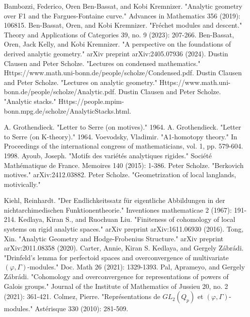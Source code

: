 \documentclass[12pt]{article}
\theoremstyle{definition}
\begin{document}
\newpage
\begin{thebibliography}{}

 Bambozzi, Federico, Oren Ben-Bassat, and Kobi Kremnizer. "Analytic geometry over F1 and the Fargues-Fontaine curve." Advances in Mathematics 356 (2019): 106815. 
 Ben-Bassat, Oren, and Kobi Kremnizer. "Fr\'echet modules and descent." Theory and Applications of Categories 39, no. 9 (2023): 207-266.
 Ben-Bassat, Oren, Jack Kelly, and Kobi Kremnizer. "A perspective on the foundations of derived analytic geometry." arXiv preprint arXiv:2405.07936 (2024).
 Dustin Clausen and Peter Scholze. "Lectures on condensed mathematics." Https://www.math.uni-bonn.de/people/scholze/Condensed.pdf. 
 Dustin Clausen and Peter Scholze. "Lectures on analytic geometry." Https://www.math.uni-bonn.de/people/scholze/Analytic.pdf.  
 Dustin Clausen and Peter Scholze. "Analytic stacks." Https://people.mpim-bonn.mpg.de/scholze/AnalyticStacks.html.  
 



 A. Grothendieck. "Letter to Serre (on motives)." 1964.
 A. Grothendieck. "Letter to Serre (on K-theory)." 1964.
 Voevodsky, Vladimir. "A1-homotopy theory." In Proceedings of the international congress of mathematicians, vol. 1, pp. 579-604. 1998. 
 Ayoub, Joseph. "Motifs des vari\'et\'es analytiques rigides." Soci\'et\'e Math\'ematique de France. Memoires 140 (2015): 1-386.
 Peter Scholze. "Berkovich motives." arXiv:2412.03882.
 Peter Scholze. "Geometrization of local langlands, motivically."


 Kiehl, Reinhardt. "Der Endlichkeitssatz f\"ur eigentliche Abbildungen in der nichtarchimedischen Funktionentheorie." Inventiones mathematicae 2 (1967): 191-214. 
 Kedlaya, Kiran S., and Ruochuan Liu. "Finiteness of cohomology of local systems on rigid analytic spaces." arXiv preprint arXiv:1611.06930 (2016).
 Tong, Xin. "Analytic Geometry and Hodge-Frobenius Structure." arXiv preprint arXiv:2011.08358 (2020).
 Carter, Annie, Kiran S. Kedlaya, and Gergely Z\'abr\'adi. "Drinfeld's lemma for perfectoid spaces and overconvergence of multivariate $(\varphi, \Gamma)$-modules." Doc. Math 26 (2021): 1329-1393. 
 Pal, Aprameyo, and Gergely Z\'abr\'adi. "Cohomology and overconvergence for representations of powers of Galois groups." Journal of the Institute of Mathematics of Jussieu 20, no. 2 (2021): 361-421.
 Colmez, Pierre. "Repr\'esentations de $GL_2(Q_p)$ et $(\varphi, \Gamma)$-modules." Ast\'erisque 330 (2010): 281-509.


\end{thebibliography}
\end{document}
